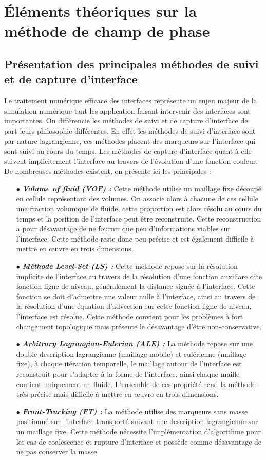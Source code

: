 \chapter{Éléments théoriques sur la méthode de champ de phase}
\section{Présentation des principales méthodes de suivi et de capture d'interface}

Le traitement numérique efficace des interfaces représente un enjeu majeur de la simulation numérique tant les application faisant intervenir des interfaces sont importantes. On différencie les méthodes de suivi et de capture d'interface de part leurs philosophie différentes. En effet les méthodes de suivi d'interface sont par nature lagrangienne, ces méthodes placent des marqueurs sur l'interface qui sont suivi au cours du temps. Les méthodes de capture d'interface quant à elle suivent implicitement l'interface au travers de l'évolution d'une fonction couleur. De nombreuses méthodes existent, on présente ici les principales :
\begin{itemize}
	\item[$\bullet$] \textit{\textbf{Volume of fluid (VOF) : }} Cette méthode utilise un maillage fixe découpé en cellule représentant des volumes. On associe alors à chacune de ces cellule une fraction volumique de fluide, cette proportion est alors résolu au cours du temps et la position de l'interface peut être reconstruite. Cette reconstruction a pour désavantage de ne fournir que peu d'informations viables sur l'interface. Cette méthode reste donc peu précise et est également difficile à mettre en \oe uvre en trois dimensions.
	\item[$\bullet$] \textit{\textbf{Méthode Level-Set (LS) : }}	Cette méthode repose sur la résolution implicite de l'interface au travers de la résolution d'une fonction auxiliare dite fonction ligne de niveau, généralement la distance signée à l'interface. Cette fonction se doit d'admettre une valeur nulle à l'interface, ainsi au travers de la résolution d'une équation d'advection sur cette fonction ligne de niveau, l'interface est résolue. Cette méthode convient pour les problèmes à fort changement topologique mais présente le désavantage d'être non-conservative.
	\item[$\bullet$]\textit{ \textbf{Arbitrary Lagrangian-Eulerian (ALE) : }} La méthode repose sur une double description lagrangienne (maillage mobile) et eulérienne (maillage fixe), à chaque itération temporelle, le maillage autour de l'interface est reconstruit pour s'adapter à la forme de l'interface, ainsi chaque maille contient uniquement un fluide. L'ensemble de ces propriété rend la méthode très précise mais difficile à mettre en \oe uvre en trois dimensions.
	\item[$\bullet$]\textit{ \textbf{Front-Tracking (FT) : }} La méthode utilise des marqueurs sans masse positionné sur l'interface transporté suivant une description lagrangienne sur un maillage fixe. Cette méthode nécessite l'implémentation d'algorithme pour les cas de coalescence et rupture d'interface et possède comme désavantage de ne pas conserver la masse.
\end{itemize}
